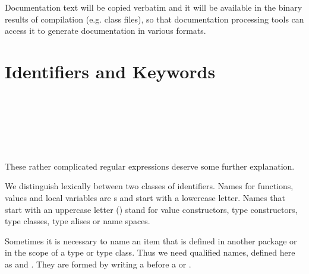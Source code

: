 
Documentation text will be copied verbatim and it will be available in the binary results of compilation (e.g. \java{} class files), so that documentation processing tools can access it to generate documentation in various formats.


\section{Identifiers and Keywords}  \label {qualified names}

\begin{flushleft}

\\

 \\

 \\

   \oder{} \\
   \oder{} \\
\end{flushleft}

These rather complicated regular expressions deserve some further
explanation.

We distinguish lexically between two classes of identifiers.
Names for functions, values and local variables are s
and start with a lowercase letter.
Names that start with an uppercase letter ()
stand for value constructors,
type constructors, type classes, type alises or name spaces.

Sometimes it is necessary to name an item that is defined in another
package or in the scope of a type or type class. Thus we need qualified
names, defined here as  and . They are formed
by writing a  before a  or .

